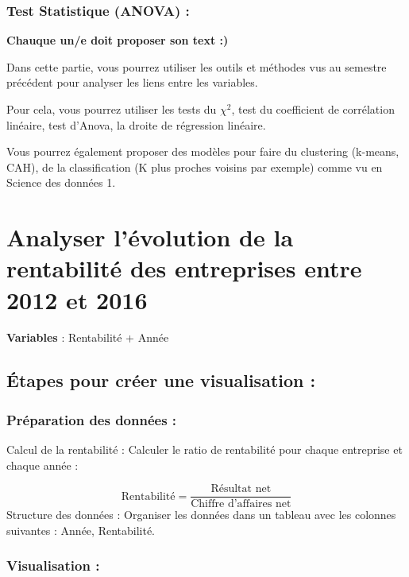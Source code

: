 \documentclass[mstat,12pt]{unswthesis}
\begin{document}
\subsubsection{Test Statistique (ANOVA) :}\label{test-statistique-anova}

\textbf{Chauque un/e doit proposer son text :) }

Dans cette partie, vous pourrez utiliser les outils et méthodes vus au
semestre précédent pour analyser les liens entre les variables.

Pour cela, vous pourrez utiliser les tests du \(\chi^2\), test du
coefficient de corrélation linéaire, test d'Anova, la droite de
régression linéaire.

Vous pourrez également proposer des modèles pour faire du clustering
(k-means, CAH), de la classification (K plus proches voisins par
exemple) comme vu en Science des données 1.

\newpage

\section{\texorpdfstring{\textbf{Analyser l'évolution de la rentabilité
des entreprises entre 2012 et
2016}}{Analyser l'évolution de la rentabilité des entreprises entre 2012 et 2016}}\label{analyser-luxe9volution-de-la-rentabilituxe9-des-entreprises-entre-2012-et-2016}

\bigskip

\textbf{Variables} : Rentabilité + Année

\subsection{Étapes pour créer une visualisation
:}\label{uxe9tapes-pour-cruxe9er-une-visualisation-4}

\subsubsection{Préparation des données
:}\label{pruxe9paration-des-donnuxe9es}

Calcul de la rentabilité : Calculer le ratio de rentabilité pour chaque
entreprise et chaque année :

\[
\text{Rentabilité} = \frac{\text{Résultat net}}{\text{Chiffre d'affaires net}}
\] Structure des données : Organiser les données dans un tableau avec
les colonnes suivantes : Année, Rentabilité.

\subsubsection{Visualisation :}\label{visualisation-1}
\end{document}
